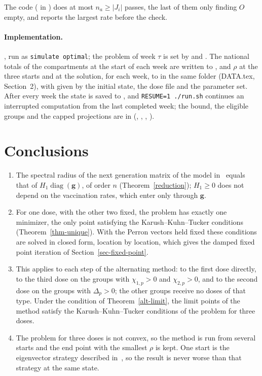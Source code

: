 \documentclass[11pt]{article}
\theoremstyle{plain}
\theoremstyle{remark}
\numberwithin{equation}{section}
\begin{document}
The code ( in ) does at most $n_a\ge|J_i|$ passes,
the last of them only finding $O$ empty, and reports the largest rate before the
check.

{\sloppy
\paragraph{Implementation.} , run as
\texttt{simulate optimal}; the problem of week $\tau$ is set by
 and . The national totals of
the compartments at the start of each week are written to
, and $\rho$
at the three starts and at the solution, for each week, to
 in the same folder (DATA.tex,
Section~2), with  given by the initial state, the dose file and the parameter
set. After every week the state is saved to
, and \texttt{RESUME=1 ./run.sh} continues an
interrupted computation from the last completed week; the bound, the eligible groups and the capped projections are in
 (, , ,
).\par}

\section{Conclusions}\label{sec-conclusions}

\begin{enumerate}
\item The spectral radius of the next generation matrix of the model
in~\cite{2026Feng_Day_Glasser} equals that of $H_1\operatorname{diag}(\bm g)$, of
order $n$ (Theorem~\ref{reduction}); $H_1\ge 0$ does not depend on the
vaccination rates, which enter only through $\bm g$.
\item For one dose, with the other two fixed, the problem has exactly one
minimizer, the only point satisfying the Karush--Kuhn--Tucker conditions
(Theorem~\ref{thm-unique}). With the Perron vectors held fixed these conditions
are solved in closed form, location by location, which gives the damped fixed
point iteration of Section~\ref{sec-fixed-point}.
\item This applies to each step of the alternating method: to the first dose
directly, to the third dose on the groups with $\chi_{1,p}>0$ and
$\chi_{2,p}>0$, and to the second dose on the groups with $\Delta_p>0$; the
other groups receive no doses of that type. Under the condition of
Theorem~\ref{alt-limit}, the limit points of the method satisfy the
Karush--Kuhn--Tucker conditions of the problem for three doses.
\item The problem for three doses is not convex, so the method is run from
several starts and the end point with the smallest $\rho$ is kept. One start is
the eigenvector strategy described in~\cite{2026Feng_Day_Glasser}, so the result is never
worse than that strategy at the same state.
\end{enumerate}
\end{document}
